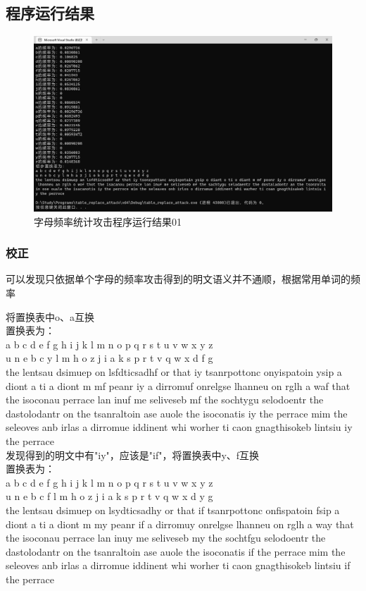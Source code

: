 \subsection{程序运行结果}
\begin{figure}[H]
	\centering
	\includegraphics[width=16cm]{figure/004.png}
	\caption{字母频率统计攻击程序运行结果01}
	\label{fig:字母频率统计攻击程序运行结果01}
\end{figure}

\subsubsection{校正}
可以发现只依据单个字母的频率攻击得到的明文语义并不通顺，根据常用单词的频率

	将置换表中o、a互换\\
	置换表为：\\
	a b c d e f g h i j k l m n o p q r s t u v w x y z\\
	u n e b c y l m h o z j i a k s p r t v q w x d f g\\
	
	the lentsau dsimuep on lsfdticsadhf or that iy tsanrpottonc onyispatoin ysip a diont a ti a diont m mf peanr iy a dirromuf onrelgse lhanneu on rglh a waf that the isoconau perrace lan inuf me seliveseb mf the sochtygu selodoentr the dastolodantr on the tsanraltoin ase auole the isoconatis iy the perrace mim the seleoves anb irlas a dirromue iddinent whi worher ti caon gnagthisokeb lintsiu iy the perrace\\
	
	发现得到的明文中有"iy"，应该是"if"，将置换表中y、f互换\\
	
	置换表为：\\
	a b c d e f g h i j k l m n o p q r s t u v w x y z\\
	u n e b c f l m h o z j i a k s p r t v q w x d y g\\
	the lentsau dsimuep on lsydticsadhy or that if tsanrpottonc onfispatoin fsip a diont a ti a diont m my peanr if a dirromuy onrelgse lhanneu on rglh a way that the isoconau perrace lan inuy me seliveseb my the sochtfgu selodoentr the dastolodantr on the tsanraltoin ase auole the isoconatis if the perrace mim the seleoves anb irlas a dirromue iddinent whi worher ti caon gnagthisokeb lintsiu if the perrace\\
	
